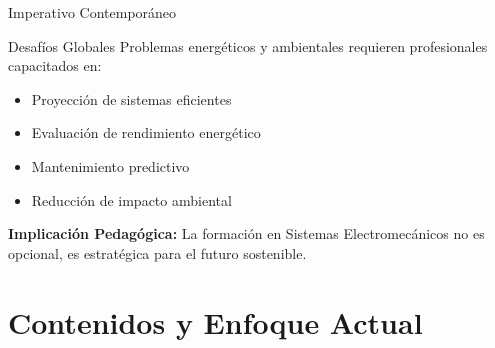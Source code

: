 \documentclass[aspectratio=43]{beamer}
\begin{document}
  \begin{frame}{Imperativo Contemporáneo}
  \begin{alertblock}{Desafíos Globales}
  Problemas energéticos y ambientales requieren profesionales capacitados en:
  \begin{itemize}
  \item Proyección de sistemas eficientes
  \item Evaluación de rendimiento energético
  \item Mantenimiento predictivo
  \item Reducción de impacto ambiental
  \end{itemize}
  \end{alertblock}
  
  \pause
  
  \textbf{Implicación Pedagógica:} La formación en Sistemas Electromecánicos no es opcional, es estratégica para el futuro sostenible.
  
  \end{frame}
  
  \section{Contenidos y Enfoque Actual}
  
\end{document}
